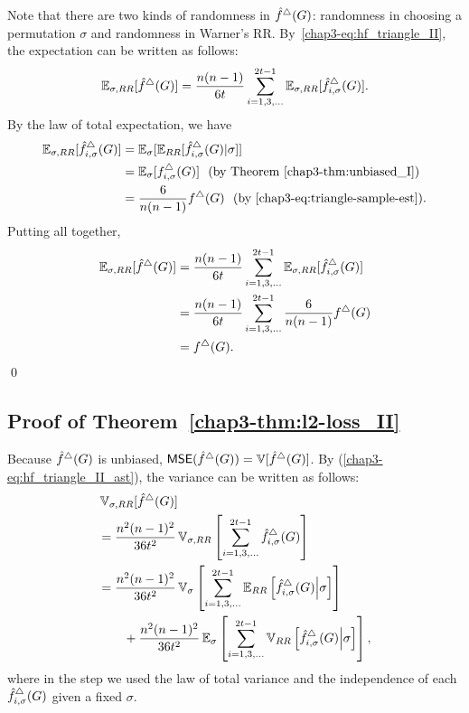 Note that there are two kinds of randomness in $\hat{f}^\triangle(G)$: randomness in
choosing a permutation $\sigma$ and randomness in Warner's RR.
By~\eqref{chap3-eq:hf_triangle_II}, the expectation can be written as follows:
\begin{align*}
    \operatorname{\mathbb{E}}_{\sigma, RR}[\hat{f}^\triangle(G)]
    = \frac{n(n-1)}{6t} \sum_{i=1, 3, \ldots}^{2t-1} \operatorname{\mathbb{E}}_{\sigma,
    RR}[\hat{f}_{i,\sigma}^\triangle(G)].
\end{align*}
By the law of total expectation, we have
\begin{align*}
    \operatorname{\mathbb{E}}_{\sigma, RR}[\hat{f}_{i,\sigma}^\triangle(G)]
    &= \operatorname{\mathbb{E}}_\sigma [\operatorname{\mathbb{E}}_{RR}[\hat{f}_{i,\sigma}^\triangle(G) | \sigma]] \\
    &= \operatorname{\mathbb{E}}_\sigma [f_{i,\sigma}^\triangle(G)] ~~ \text{(by
    Theorem~\ref{chap3-thm:unbiased_I})} \\
    &= \frac{6}{n(n-1)}f^\triangle(G)~~ \text{(by~\eqref{chap3-eq:triangle-sample-est})}.
\end{align*}
Putting all together,
\begin{align*}
  \operatorname{\mathbb{E}}_{\sigma, RR}[\hat{f}^\triangle(G)] &=
  \frac{n(n-1)}{6t}\sum_{i=1,3,\ldots}^{2t-1} \operatorname{\mathbb{E}}_{\sigma,
  RR}[\hat{f}_{i,\sigma}^\triangle(G)] \\
  &= \frac{n(n-1)}{6t} \sum_{i=1,3,\ldots}^{2t-1} \frac{6}{n(n-1)}f^\triangle(G)
  \\
  &= f^\triangle(G).
\end{align*}\qed

\subsection{Proof of Theorem~\ref{chap3-thm:l2-loss_II}}
\label{chap3-sub:l2-loss_II_proof}
Because $\hat{f}^\triangle(G)$ is unbiased, $\operatorname{\textsf{MSE}}(\hat{f}^\triangle(G)) = \operatorname{\mathbb{V}}[\hat{f}^\triangle(G)]$.
By (\ref{chap3-eq:hf_triangle_II_ast}), the variance can be written as follows:
\begin{align}
    & \operatorname{\mathbb{V}}_{\sigma,RR}[\hat{f}^\triangle(G)] \nonumber\\
    &= \frac{n^2(n-1)^2}{36t^2}
    \operatorname{\mathbb{V}}_{\sigma, RR}\left[\sum_{i=1, 3, \ldots}^{2t-1} \hat{f}_{i,\sigma}^\triangle(G)\right] \nonumber\\
    &= \frac{n^2(n-1)^2}{36t^2}
    \operatorname{\mathbb{V}}_\sigma\left[\sum_{i = 1, 3, \ldots}^{2t-1}
    \operatorname{\mathbb{E}}_{RR}\left[\hat{f}_{i,\sigma}^\triangle(G)\middle|\sigma \right]\right]
    \label{chap3-eq:thm:l2-loss_II_ve} \\
    &\qquad + \frac{n^2(n-1)^2}{36t^2}
    \operatorname{\mathbb{E}}_\sigma\left[\sum_{i = 1, 3, \ldots}^{2t-1} \operatorname{\mathbb{V}}_{RR}\left[\hat{f}_{i,\sigma}^\triangle(G)\middle|\sigma \right]\right],
    \label{chap3-eq:thm:l2-loss_II_ev}
\end{align}
where in the
step we used the law of total variance and the independence of each
$\hat{f}_{i,\sigma}^\triangle(G)$ given a fixed $\sigma$.

